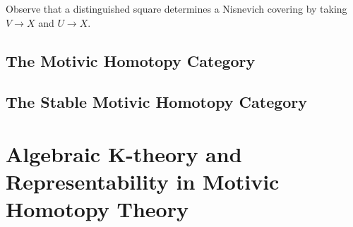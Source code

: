 \documentclass[12pt]{article}
\numberwithin{equation}{section}
\numberwithin{lemma}{section}
\numberwithin{theorem}{section}
\numberwithin{proposition}{section}
\numberwithin{corollary}{section}
\numberwithin{definition}{section}
\numberwithin{example}{section}
\numberwithin{remark}{section}
\begin{document}
Observe that a distinguished square determines a Nisnevich covering by
taking $V \to X$ and $U \to X$.

\subsection{The Motivic Homotopy Category}

\subsection{The Stable Motivic Homotopy Category}


\section{Algebraic K-theory and Representability in Motivic Homotopy
  Theory}



\nocite{*}



\printindex
\end{document}
